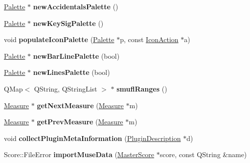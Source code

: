 \begin{DoxyCompactItemize}
\hyperlink{class_ms_1_1_palette}{Palette} $\ast$ {\bfseries new\+Accidentals\+Palette} ()
\item 
\mbox{\label{namespace_ms_a94a51208d440bc18b4fd54e04f2dcfe5}} 
\hyperlink{class_ms_1_1_palette}{Palette} $\ast$ {\bfseries new\+Key\+Sig\+Palette} ()
\item 
\mbox{\label{namespace_ms_a2c02e0ccfa5c9bb07c70d9306e828d9d}} 
void {\bfseries populate\+Icon\+Palette} (\hyperlink{class_ms_1_1_palette}{Palette} $\ast$p, const \hyperlink{struct_ms_1_1_icon_action}{Icon\+Action} $\ast$a)
\item 
\mbox{\label{namespace_ms_aa719639e4a26d6bf43f0bedeaed1f19c}} 
\hyperlink{class_ms_1_1_palette}{Palette} $\ast$ {\bfseries new\+Bar\+Line\+Palette} (bool)
\item 
\mbox{\label{namespace_ms_a78f9959a2d3ea1ba8d6088117f64a5a1}} 
\hyperlink{class_ms_1_1_palette}{Palette} $\ast$ {\bfseries new\+Lines\+Palette} (bool)
\item 
\mbox{\label{namespace_ms_a31600e6fc226d159f5b584becef917cc}} 
Q\+Map$<$ Q\+String, Q\+String\+List $>$ $\ast$ {\bfseries smufl\+Ranges} ()
\item 
\mbox{\label{namespace_ms_aa1c1beab8b51dfe2c81a6a582461be36}} 
\hyperlink{class_ms_1_1_measure}{Measure} $\ast$ {\bfseries get\+Next\+Measure} (\hyperlink{class_ms_1_1_measure}{Measure} $\ast$m)
\item 
\mbox{\label{namespace_ms_aa75ff7b0a1efb3b8936180fd3a7b6a72}} 
\hyperlink{class_ms_1_1_measure}{Measure} $\ast$ {\bfseries get\+Prev\+Measure} (\hyperlink{class_ms_1_1_measure}{Measure} $\ast$m)
\item 
\mbox{\label{namespace_ms_a81b8ae9245d51a4a51fe3bb4bb82117a}} 
void {\bfseries collect\+Plugin\+Meta\+Information} (\hyperlink{struct_ms_1_1_plugin_description}{Plugin\+Description} $\ast$d)
\item 
\mbox{\label{namespace_ms_a85d461cecda41813ecbd5f20da59c488}} 
Score\+::\+File\+Error {\bfseries import\+Muse\+Data} (\hyperlink{class_ms_1_1_master_score}{Master\+Score} $\ast$score, const Q\+String \&name)

\end{DoxyCompactItemize}
